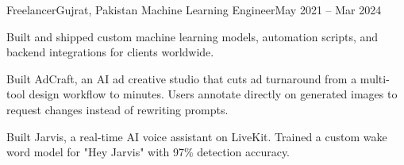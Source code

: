 \resumeSubheading
  {Freelancer}{Gujrat, Pakistan}
  {Machine Learning Engineer}{May 2021 -- Mar 2024}
  \resumeItemListStart
    \item \small{Built and shipped custom machine learning models, automation scripts, and backend integrations for clients worldwide.}
    \item \small{Built AdCraft, an AI ad creative studio that cuts ad turnaround from a multi-tool design workflow to minutes. Users annotate directly on generated images to request changes instead of rewriting prompts.}
    \item \small{Built Jarvis, a real-time AI voice assistant on LiveKit. Trained a custom wake word model for "Hey Jarvis" with 97\% detection accuracy.}
  \resumeItemListEnd
